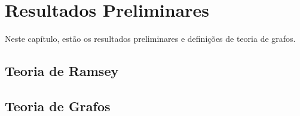 
\chapter{Resultados Preliminares}

Neste capítulo, estão os resultados preliminares e definições de teoria de grafos.


\section{Teoria de Ramsey}


\section{Teoria de Grafos}

